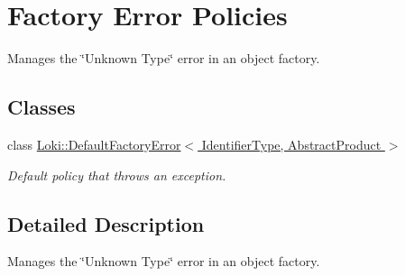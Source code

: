 \hypertarget{group__FactoryErrorPoliciesGroup}{}\section{Factory Error Policies}
\label{group__FactoryErrorPoliciesGroup}


Manages the \char`\"{}\+Unknown Type\char`\"{} error in an object factory.  


\subsection*{Classes}
\begin{DoxyCompactItemize}
\item 
class \hyperlink{structLoki_1_1DefaultFactoryError}{Loki\+::\+Default\+Factory\+Error$<$ Identifier\+Type, Abstract\+Product $>$}
\begin{DoxyCompactList}\small\item\em Default policy that throws an exception. \end{DoxyCompactList}\end{DoxyCompactItemize}


\subsection{Detailed Description}
Manages the \char`\"{}\+Unknown Type\char`\"{} error in an object factory. 

